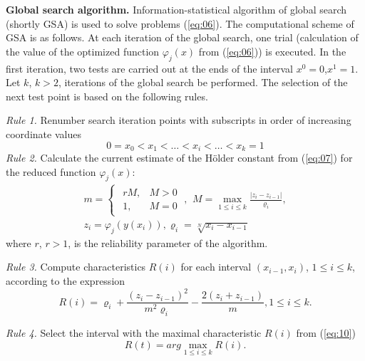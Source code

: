 \documentclass[runningheads]{llncs}
\begin{document}
\textbf{Global search algorithm.} Information-statistical algorithm of global search (shortly GSA) \cite{Konnov2025,Gergel2019_2,Gergel2018,GergelKozinov2020,Strongin2000,Sergeyev2013} is used to solve problems (\ref{eq:06}). The computational scheme of GSA is as follows. At each iteration of the global search, one trial (calculation of the value of the optimized function $\varphi_j (x)$ from (\ref{eq:06})) is executed. In the first iteration, two tests are carried out at the ends of the interval $x^0=0$,$x^1=1$. Let $k$, $k>2$, iterations of the global search be performed. The selection of the next test point is based on the following rules.

\textit{Rule 1.} Renumber search iteration points with subscripts in order of increasing coordinate values
\begin{equation}
    \label{eq:08}
    0 = x_0 < x_1 < \dots < x_i < \dots < x_{k} = 1
\end{equation}
\textit{Rule 2.} Calculate the current estimate of the H{\" o}lder constant from (\ref{eq:07}) for the reduced function $\varphi_j (x)$:
\begin{equation}
    \label{eq:9}
		\begin{matrix}
		m=\begin{cases}
				\begin{matrix}
					 r M, & M >0 \\
					 1, & M = 0 
				\end{matrix} \; , 
			\end{cases}
		M = \max_{1 \leq i \leq k} \frac{| z_i - z_{i-1}|}{\varrho_i}, \\
		z_i = \varphi_j( y(x_i) ), \varrho_i=\sqrt[N]{x_i-x_{i-1}}
		\end{matrix}
\end{equation}
where $r$, $r>1$, is the reliability parameter of the algorithm. 

\textit{Rule 3.} Compute characteristics $R(i)$ for each interval $(x_{i-1}, x_i)$, $1\leq i \leq k$, according to the expression
\begin{equation}
    \label{eq:10}
    R(i) = \varrho_i + \frac{(z_i-z_{i-1})^2}{m^2 \varrho_i} - \frac{2 (z_i+z_{i-1})}{m}, 1 \leq i \leq k.
\end{equation}

\textit{Rule 4.} Select the interval with the maximal characteristic $R(i)$ from (\ref{eq:10})
\begin{equation}
    \label{eq:11}
    R(t) = arg\max_{1 \leq i \leq k} {R(i)}.
\end{equation}
\end{document}
